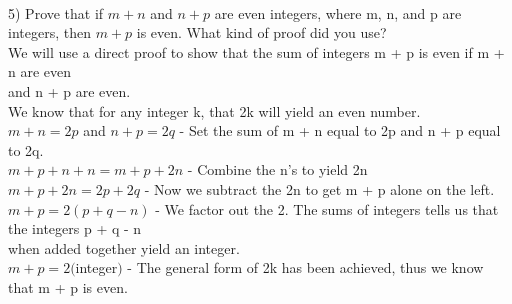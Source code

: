 \documentclass{article}
\begin{document}
\begin{flushleft}
~\\
\setlength\parindent{0pt}5) Prove that if $m + n$ and $n + p$ are even integers, where m, n, and p are integers, then $m + p$ is even.  What kind of proof did you use?\\
\setlength\parindent{24pt} We will use a direct proof to show that the sum of integers m + p is even if m + n are even \\
and n + p are even. \\
\setlength\parindent{24pt} We know that for any integer k, that 2k will yield an even number.\\
\setlength\parindent{24pt} $m + n = 2p$ and $n + p = 2q$ - Set the sum of m + n equal to 2p and n + p equal to 2q. \\
\setlength\parindent{24pt} $m + p + n + n = m + p + 2n$ - Combine the n's to yield 2n\\
\setlength\parindent{24pt} $m + p + 2n = 2p + 2q$ - Now we subtract the 2n to get m + p alone on the left. \\
\setlength\parindent{24pt} $m + p = 2(p + q -n)$ - We factor out the 2.  The sums of integers tells us that the integers p + q - n \\
when added together yield an integer. \\
\setlength\parindent{24pt} $m + p = 2($integer$)$ - The general form of 2k has been achieved, thus we know that m + p is even. \\



\end{flushleft}
\end{document}
